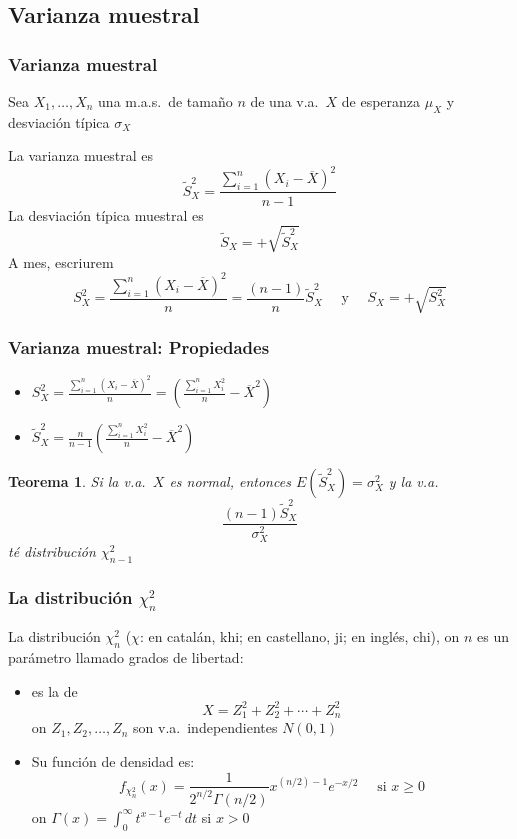 \documentclass[12pt,t]{beamer}
\renewcommand{\emph}[1]{{\color{red}#1}}
\renewcommand{\geq}{\geqslant}
\theoremstyle{plain}
\newtheorem{teorema}{Teorema}
\theoremstyle{definition}
\begin{document}
\subsection{Varianza muestral}

\begin{frame}
\frametitle{Varianza muestral}

Sea $X_1,\ldots, X_n$ una m.a.s.\ de tamaño $n$ de una v.a.\ $X$ de esperanza $\mu_X$ y desviación típica $\sigma_X$
\medskip

La \emph{varianza muestral} es
$$
\widetilde{S}_{X}^2=\frac{\sum_{i=1}^n (X_{i}-\overline{X})^2}{n-1}
$$
La \emph{desviación típica muestral} es 
$$
\widetilde{S}_{X}=+\sqrt{\widetilde{S}_{X}^2}
$$
A mes, escriurem
$$
S^2_{X}=\frac{\sum_{i=1}^n (X_{i}-\overline{X})^2}{n}=\frac{(n-1)}{n}\widetilde{S}^2_{X}\quad\mbox{ y }\quad S_X=+\sqrt{S_X^2}
$$
\end{frame}


\begin{frame}
\frametitle{Varianza muestral: Propiedades}
\begin{itemize}
\item $\displaystyle S^2_X=\frac{\sum_{i=1}^n (X_{i}-\overline{X})^2}{n}=\left(\frac{\sum_{i=1}^n
X_{i}^2}{n}-\overline{X}^2\right)$\medskip

\item $\displaystyle \widetilde{S}_{X}^2=\frac{n}{n-1}\left(\frac{\sum_{i=1}^n
X_{i}^2}{n}-\overline{X}^2\right)$\medskip

\end{itemize}


\begin{teorema}
Si la v.a.\ $X$ es normal, entonces $E(\widetilde{S}_{X}^2)=\sigma_{X}^2$ y 
la v.a.
$$
\frac{(n-1)\widetilde{S}_{X}^2}{\sigma_{X}^2}
$$
té distribución $\chi_{n-1}^2$
\end{teorema}
\end{frame}


\begin{frame}
\frametitle{La distribución $\chi_n^2$}

La distribución $\chi_n^2$ ($\chi$: en catalán, \emph{khi}; en castellano, \emph{ji}; en inglés, \emph{chi}), on $n$  es un parámetro llamado  \emph{grados de libertad}:
\begin{itemize}
\item es la de 
$$
X=Z_{1}^{2}+Z_{2}^{2}+\cdots +Z_{n}^{2}
$$ 
on  $Z_{1},Z_{2},\ldots, Z_{n}$ son v.a.\  independientes  $N(0,1)$
\medskip

\item Su función de densidad es:
$$
f_{\chi_n^2}(x)={\frac{1}{2^{n/2} \Gamma (n/2)}} x^{(n/2)-1} e^{-x/2}\quad\mbox{ si $x\geq 0$}
$$
on $\Gamma(x)=\int_{0}^{\infty} t^{x-1}e^{-t}\, dt$ si $x> 0$

\end{itemize}
\end{frame}
\end{document}
